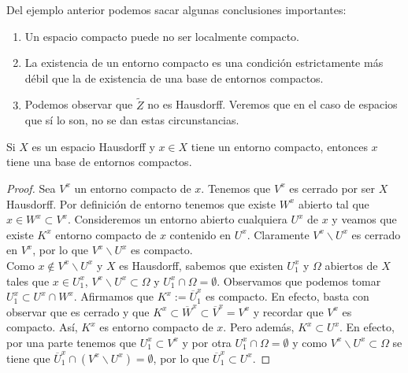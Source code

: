 \begin{observation}
Del ejemplo anterior podemos sacar algunas conclusiones importantes:
\begin{enumerate}
\item Un espacio compacto puede no ser localmente compacto.
\item La existencia de un entorno compacto es una condición estrictamente más débil que la de existencia de una base de entornos compactos.
\item Podemos observar que $\displaystyle \tilde{Z} $ no es Hausdorff. Veremos que en el caso de espacios que sí lo son, no se dan estas circunstancias. 
\end{enumerate}
\end{observation}
\begin{prop}
Si $\displaystyle X $ es un espacio Hausdorff y $\displaystyle x \in X $ tiene un entorno compacto, entonces $\displaystyle x $ tiene una base de entornos compactos. 
\end{prop}
\begin{proof}
Sea $\displaystyle V^{x} $ un entorno compacto de $\displaystyle x $. Tenemos que $\displaystyle V^{x} $ es cerrado por ser $\displaystyle X $ Hausdorff. Por definición de entorno tenemos que existe $\displaystyle W^{x} $ abierto tal que $\displaystyle x \in W^{x}\subset V^{x} $. Consideremos un entorno abierto cualquiera $\displaystyle U^{x} $ de $\displaystyle x $ y veamos que existe $\displaystyle K^{x} $ entorno compacto de $\displaystyle x $ contenido en $\displaystyle U^{x} $. Claramente $\displaystyle V^{x} \backslash U^{x} $ es cerrado en $\displaystyle V^{x} $, por lo que $\displaystyle V^{x} \backslash U^{x} $ es compacto. \\

Como $\displaystyle x\not\in V^{x} \backslash U^{x} $ y $\displaystyle X $ es Hausdorff, sabemos que existen $\displaystyle U^{x}_{1} $ y $\displaystyle \Omega  $ abiertos de $\displaystyle X $ tales que $\displaystyle x\in U^{x}_{1} $, $\displaystyle V^{x} \backslash U^{x}\subset \Omega  $ y $\displaystyle U^{x}_{1}\cap \Omega = \emptyset  $. Observamos que podemos tomar $\displaystyle U^{x}_{1}\subset U^{x}\cap W^{x} $. Afirmamos que $\displaystyle K^{x}:=\overline{U}^{x}_{1} $ es compacto. En efecto, basta con observar que es cerrado y que $\displaystyle K^{x}\subset \overline{W}^{x}\subset\overline{V}^{x}= V^{x} $ y recordar que $\displaystyle V^{x} $ es compacto. 
Así, $\displaystyle K^{x} $ es entorno compacto de $\displaystyle x $. Pero además, $\displaystyle K^{x}\subset U^{x} $. 
En efecto, por una parte tenemos que $\displaystyle U^{x}_{1}\subset V^{x} $ y por otra $\displaystyle U^{x}_{1}\cap \Omega = \emptyset $ y como $\displaystyle V^{x}\backslash U^{x} \subset \Omega  $ se tiene que $\displaystyle \overline{U}^{x}_{1}\cap \left(V^{x}\backslash U^{x}\right)=\emptyset $, por lo que $\displaystyle \overline{U}^{x}_{1}\subset U^{x} $.
\end{proof}
